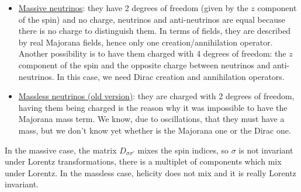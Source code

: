 \documentclass[../main.tex]{subfiles}
\begin{document}
\begin{itemize}
    \item \underline{Massive neutrinos}: they have 2 degrees of freedom (given by the $z$ component of the spin) and no charge, neutrinos and anti-neutrinos are equal because there is no charge to distinguish them. In terms of fields, they are described by real Majorana fields, hence only one creation/annihilation operator. Another possibility is to have them charged with 4 degrees of freedom: the $z$ component of the spin and the opposite charge between neutrinos and anti-neutrinos. In this case, we need Dirac creation and annihilation operators.
    \item \underline{Massless neutrinos (old version)}: they are charged with 2 degrees of freedom, having them being charged is the reason why it was impossible to have the Majorana mass term. We know, due to oscillations, that they must have a mass, but we don't know yet whether is the Majorana one or the Dirac one.
\end{itemize}
In the massive case, the matrix $D_{\sigma\sigma'}$ mixes the spin indices, so $\sigma$ is not invariant under Lorentz transformations, there is a multiplet of components which mix under Lorentz. In the massless case, helicity does not mix and it is really Lorentz invariant.
\end{document}
